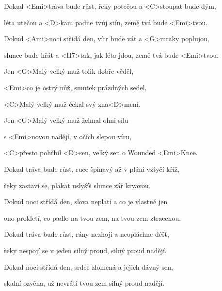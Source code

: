 

\zs
Dokud <Emi>tráva bude růst,
řeky potečou a <C>stoupat bude dým,

léta utečou a <D>kam padne tvůj stín,
země tvá bude <Emi>tvou.

Dokud <Ami>noci střídá den,
vítr bude vát a <G>mraky poplujou,

slunce bude hřát a <H7>tak, jak léta jdou,
země tvá bude <Emi>tvou.
\ks

\zr
Jen <G>Malý velký muž tolik dobře věděl,

<Emi>co je ostrý nůž, smutek prázdných sedel,

<C>Malý velký muž čekal svý zna<D>mení.

Jen <G>Malý velký muž žehnal ohni sílu

s <Emi>novou nadějí, v očích slepou víru,

<C>přesto pohřbil <D>sen, velký sen o Wounded <Emi>Knee.
\kr

\zs
Dokud tráva bude růst,
ruce špinavý až v pláni vztyčí kříž,

řeky zastaví se, plakat uslyšíš
slunce zář krvavou.

Dokud noci střídá den,
slova neplatí a co je vlastně jen

ono prokletí, co padlo na tvou zem,
na tvou zem ztracenou.
\ks

\zr \kr

\zs
Dokud tráva bude růst,
rány nezhojí a neopláchne déšť,

řeky nespojí se v jeden silný proud,
silný proud nadějí.

Dokud noci střídá den,
srdce zlomená a jejich dávný sen,

skalní ozvěna, už nevrátí tvou zem
silný proud nadějí.
\ks

\zr \kr

\kp





